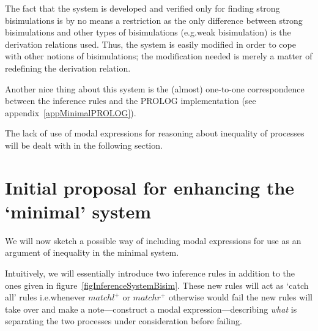 The fact that the system is developed and verified only for finding strong bisimulations is by no means a restriction as the only difference between strong bisimulations and other types of bisimulations (e.g.\@ weak bisimulation) is the derivation relations used. Thus, the system is easily modified in order to cope with other notions of bisimulations; the modification needed is merely a matter of redefining the derivation relation.

Another nice thing about this system is the (almost) one-to-one correspondence between the inference rules and the PROLOG implementation (see appendix~\ref{appMinimalPROLOG}).

The lack of use of modal expressions for reasoning about inequality of processes will be dealt with in the following section.


\section{Initial proposal for enhancing the `minimal' system}\label{secProposalEnhance}

We will now sketch a possible way of including modal expressions for use as an argument of inequality in the minimal system.

Intuitively, we will essentially introduce two inference rules in addition to the ones given in figure~\ref{figInferenceSystemBisim}. These new rules will act as `catch all' rules i.e.\@ whenever $matchl^{+}$ or $matchr^{+}$ otherwise would fail the new rules will take over and make a note---construct a modal expression---describing {\em what\/} is separating the two processes under consideration before failing.

